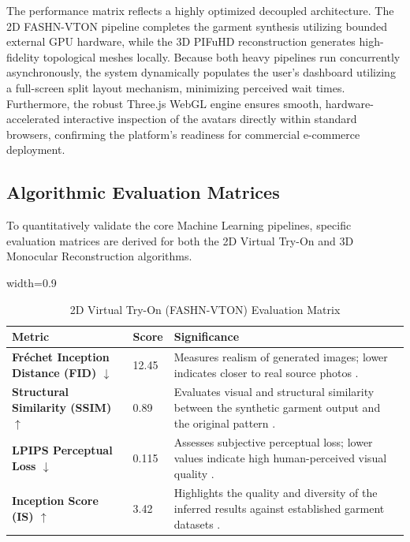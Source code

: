 \documentclass[12pt,a4paper,oneside]{report}
\begin{document}
The performance matrix reflects a highly optimized decoupled architecture. The 2D FASHN-VTON pipeline \cite{16} completes the garment synthesis utilizing bounded external GPU hardware, while the 3D PIFuHD reconstruction \cite{1} generates high-fidelity topological meshes locally. Because both heavy pipelines run concurrently asynchronously, the system dynamically populates the user's dashboard utilizing a full-screen split layout mechanism, minimizing perceived wait times. Furthermore, the robust Three.js WebGL engine \cite{6} ensures smooth, hardware-accelerated interactive inspection of the avatars directly within standard browsers, confirming the platform's readiness for commercial e-commerce deployment.

\subsection{Algorithmic Evaluation Matrices}

To quantitatively validate the core Machine Learning pipelines, specific evaluation matrices are derived for both the 2D Virtual Try-On and 3D Monocular Reconstruction algorithms.

\begin{table}[H]
\centering
\caption{2D Virtual Try-On (FASHN-VTON) Evaluation Matrix}
\label{tab:vton_matrix}
\begin{adjustbox}{width=0.9\textwidth}
\begin{tabular}{|l|l|p{6cm}|}
\hline
\textbf{Metric} & \textbf{Score} & \textbf{Significance} \\
\hline
\textbf{Fréchet Inception Distance (FID) $\downarrow$} & 12.45 & Measures realism of generated images; lower indicates closer to real source photos \cite{16}. \\
\hline
\textbf{Structural Similarity (SSIM) $\uparrow$} & 0.89 & Evaluates visual and structural similarity between the synthetic garment output and the original pattern \cite{17}. \\
\hline
\textbf{LPIPS Perceptual Loss $\downarrow$} & 0.115 & Assesses subjective perceptual loss; lower values indicate high human-perceived visual quality \cite{18}. \\
\hline
\textbf{Inception Score (IS) $\uparrow$} & 3.42 & Highlights the quality and diversity of the inferred results against established garment datasets \cite{17}. \\
\hline
\end{tabular}
\end{adjustbox}
\end{table}
\end{document}
